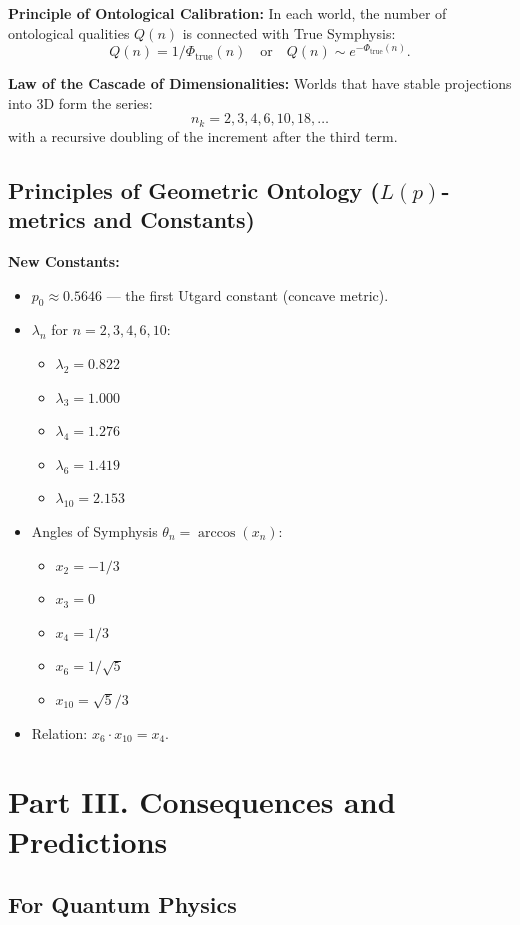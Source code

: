 \documentclass[a4paper,12pt]{article}
\begin{document}
	\textbf{Principle of Ontological Calibration:} In each world, the number of ontological qualities $Q(n)$ is connected with True Symphysis:
	\[
	Q(n) = 1 / \Phi_{\text{true}}(n) \quad \text{or} \quad Q(n) \sim e^{-\Phi_{\text{true}}(n)}.
	\]
	
	\textbf{Law of the Cascade of Dimensionalities:} Worlds that have stable projections into 3D form the series:
	\[
	n_k = 2, 3, 4, 6, 10, 18, \dots
	\]
	with a recursive doubling of the increment after the third term.
	
	\subsection{Principles of Geometric Ontology ($L(p)$-metrics and Constants)}
	
	\textbf{New Constants:}
	\begin{itemize}
		\item $p_0 \approx 0.5646$ — the first Utgard constant (concave metric).
		\item $\lambda_n$ for $n = 2,3,4,6,10$:
		\begin{itemize}
			\item $\lambda_2 = 0.822$
			\item $\lambda_3 = 1.000$
			\item $\lambda_4 = 1.276$
			\item $\lambda_6 = 1.419$
			\item $\lambda_{10} = 2.153$
		\end{itemize}
		\item Angles of Symphysis $\theta_n = \arccos(x_n)$:
		\begin{itemize}
			\item $x_2 = -1/3$
			\item $x_3 = 0$
			\item $x_4 = 1/3$
			\item $x_6 = 1/\sqrt{5}$
			\item $x_{10} = \sqrt{5}/3$
		\end{itemize}
		\item Relation: $x_6 \cdot x_{10} = x_4$.
	\end{itemize}
	
	\newpage
	\section{Part III. Consequences and Predictions}
	
	\subsection{For Quantum Physics}
	
\end{document}

